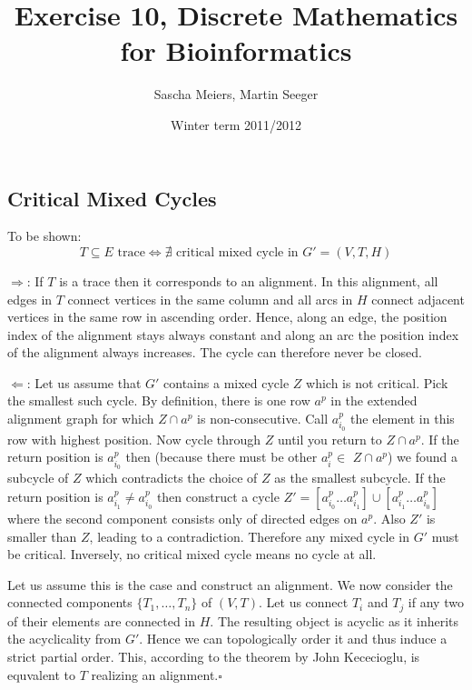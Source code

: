 \documentclass[a4paper, oneside]{scrartcl}
\author{Sascha Meiers, Martin Seeger}
\title{Exercise 10, Discrete Mathematics for Bioinformatics}
\date{Winter term 2011/2012}
\begin{document}
\maketitle


\subsection{Critical Mixed Cycles}

To be shown:
\[
T \subseteq E \textrm{ trace} \Longleftrightarrow \nexists \textrm{ critical
mixed cycle in } G' = (V, T, H)
\]

$\Rightarrow$: If $T$ is a trace then it corresponds to an alignment. In this
alignment, all edges in $T$ connect vertices in the same column and all arcs in
$H$ connect adjacent vertices in the same row in ascending order. Hence, along
an edge, the position index of the alignment stays always constant and along an
arc the position index of the alignment always increases. The cycle can
therefore never be closed.

$\Leftarrow$: Let us assume that $G'$ contains a mixed cycle $Z$ which is not
critical. Pick the smallest such cycle. By definition, there is one row $a^p$ in
the extended alignment graph for which $Z \cap a^p$ is non-consecutive. Call
$a^p_{i_0}$ the element in this row with highest position. Now cycle through $Z$
until you return to $Z \cap a^p$. 
If the return position is $a^p_{i_0}$ then
(because there must be other $a^p_i \in $ $Z \cap a^p$) we found a subcycle of $Z$ which
contradicts the choice of $Z$ as the smallest subcycle.
If the return position is $a^p_{i_1} \neq a^p_{i_0}$ then construct a cycle $Z' =
[a^p_{i_0} \ldots a^p_{i_1}] \cup [a^p_{i_1} \ldots a^p_{i_0}]$ where the second
component consists only of directed edges on $a^p$. Also $Z'$ is smaller than
$Z$, leading to a contradiction.
Therefore any mixed cycle in $G'$ must be critical. Inversely, no critical mixed
cycle means no cycle at all. 

Let us assume this is the case and construct an
alignment. We now consider the connected components $\{T_1,\ldots,T_n\}$ of
$(V, T)$. Let us connect $T_i$ and $T_j$ if any two of their elements are
connected in $H$. The resulting object is acyclic as it inherits the
acyclicality from $G'$. Hence we can topologically order it and thus induce a
strict partial order. This, according to the theorem by John Kececioglu, is
equvalent to $T$ realizing an alignment.$\square$
\end{document}
